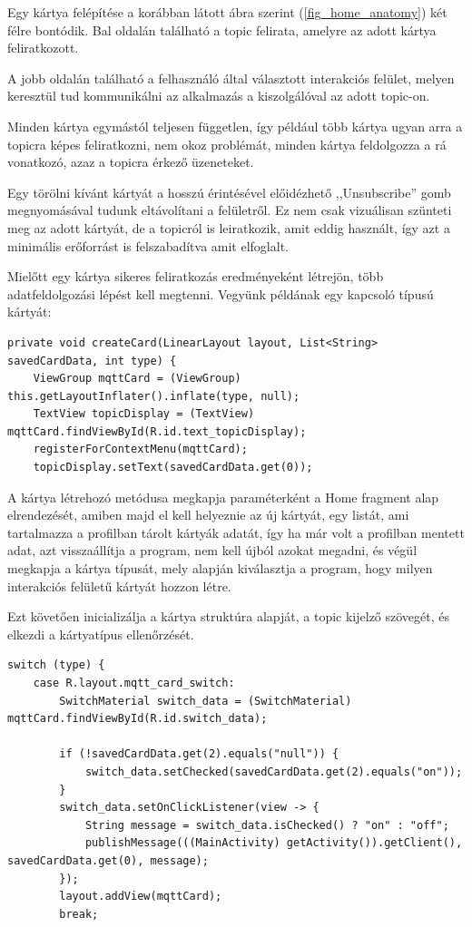 \documentclass[]{thesis-ekf}
\theoremstyle{definition}
\theoremstyle{remark}
\begin{document}
Egy kártya felépítése a korábban látott ábra szerint (\ref{fig_home_anatomy}) két félre bontódik.
Bal oldalán található a topic felirata, amelyre az adott kártya feliratkozott. 

A jobb oldalán található
a felhasználó által választott interakciós felület, melyen keresztül tud kommunikálni az alkalmazás a
kiszolgálóval az adott topic-on. 

Minden kártya egymástól teljesen független, így például több kártya ugyan
arra a topicra képes feliratkozni, nem okoz problémát, minden kártya feldolgozza a rá vonatkozó,
azaz a topicra érkező üzeneteket.

Egy törölni kívánt kártyát a hosszú érintésével előidézhető ,,Unsubscribe'' gomb megnyomásával tudunk
eltávolítani a felületről. Ez nem csak vizuálisan szünteti meg az adott kártyát, de a topicról is
leiratkozik, amit eddig használt, így azt a minimális erőforrást is felszabadítva amit elfoglalt. 

Mielőtt egy kártya sikeres feliratkozás eredményeként létrejön, több adatfeldolgozási lépést kell megtenni. 
Vegyünk példának egy kapcsoló típusú kártyát:


\lstset{language=Java}  
\begin{lstlisting}[frame=single]
private void createCard(LinearLayout layout, List<String> savedCardData, int type) {
    ViewGroup mqttCard = (ViewGroup) this.getLayoutInflater().inflate(type, null);
    TextView topicDisplay = (TextView) mqttCard.findViewById(R.id.text_topicDisplay);
    registerForContextMenu(mqttCard);
    topicDisplay.setText(savedCardData.get(0));
\end{lstlisting}

A kártya létrehozó metódusa megkapja paraméterként a Home fragment alap elrendezését, amiben majd el kell
helyeznie az új kártyát, egy listát, ami tartalmazza a profilban tárolt kártyák adatát, így ha már
volt a profilban mentett adat, azt visszaállítja a program, nem kell újból azokat megadni, és végül
megkapja a kártya típusát, mely alapján kiválasztja a program, hogy milyen interakciós felületű kártyát
hozzon létre.

Ezt követően inicializálja a kártya struktúra alapját, a topic kijelző szövegét, és elkezdi a kártyatípus ellenőrzését.

\lstset{language=Java}  
\begin{lstlisting}[frame=single]
switch (type) {
	case R.layout.mqtt_card_switch:
		SwitchMaterial switch_data = (SwitchMaterial) mqttCard.findViewById(R.id.switch_data);

		if (!savedCardData.get(2).equals("null")) {
			switch_data.setChecked(savedCardData.get(2).equals("on"));
		}
		switch_data.setOnClickListener(view -> {
			String message = switch_data.isChecked() ? "on" : "off";
			publishMessage(((MainActivity) getActivity()).getClient(), savedCardData.get(0), message);
		});
		layout.addView(mqttCard);
		break;
\end{lstlisting}
\end{document}
